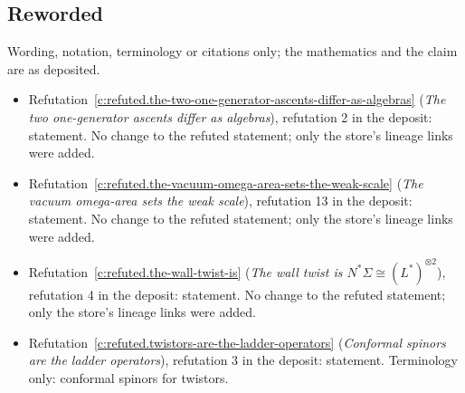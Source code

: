 \documentclass[11pt]{article}
\theoremstyle{definition}
\theoremstyle{plain}
\begin{document}
\subsection*{Reworded}
Wording, notation, terminology or citations only; the mathematics and the claim are as deposited.
\begin{itemize}\setlength{\itemsep}{2pt}
\item Refutation~\ref{c:refuted.the-two-one-generator-ascents-differ-as-algebras} (\emph{The two one-generator ascents differ as algebras}), refutation 2 in the deposit: statement. No change to the refuted statement; only the store's lineage links were added.
\item Refutation~\ref{c:refuted.the-vacuum-omega-area-sets-the-weak-scale} (\emph{The vacuum omega-area sets the weak scale}), refutation 13 in the deposit: statement. No change to the refuted statement; only the store's lineage links were added.
\item Refutation~\ref{c:refuted.the-wall-twist-is} (\emph{The wall twist is $N^{*}\Sigma \cong (L^{*})^{\otimes 2}$}), refutation 4 in the deposit: statement. No change to the refuted statement; only the store's lineage links were added.
\item Refutation~\ref{c:refuted.twistors-are-the-ladder-operators} (\emph{Conformal spinors are the ladder operators}), refutation 3 in the deposit: statement. Terminology only: conformal spinors for twistors.
\end{itemize}
\end{document}
